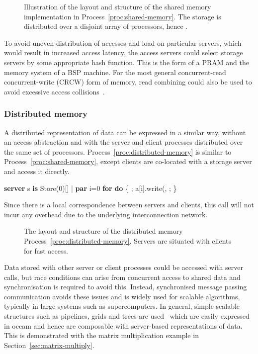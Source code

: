 \documentclass[11pt, conference, compsocconf, onecolumn]{IEEEtran}
\newcommand{\sect}[1]{Section~\ref{sec:#1}}
\newcommand{\proc}[1]{Process~\ref{proc:#1}}
\newcounter{process}
\newenvironment{Process}[1][]{\begin{procfloat}[ht]\vspace{-1.5mm}\refstepcounter{process}{\bf Process~\theprocess} #1}
{\vspace{-3.5mm}\end{procfloat}}
\newcommand{\w}[1]{{\bf #1}}
\newcommand{\inputtikz}[1]{
\begin{center}\end{center}}
\def\codespacing{1.5mm}
\newenvironment{myquote}
{\list{}{\leftmargin=4mm\rightmargin=4mm}\item[]}
{\endlist}
\newenvironment{code*}{\vspace{\codespacing}\begin{myquote}\begin{minipage}{\linewidth}\begin{alltt}}
{\end{alltt}\end{minipage}
\end{myquote}\vspace{\codespacing}
}
\begin{document}
\begin{figure}[t]
\inputtikz{figures/server-distributed-shared-memory}
\caption{Illustration of the layout and structure of the shared memory
implementation in \proc{shared-memory}. The storage is distributed over a
disjoint array of processors, hence .}
\label{fig:shared-memory}
\end{figure}

To avoid uneven distribution of accesses and load on particular servers, which
would result in increased access latency, the access servers could select
storage servers by some appropriate hash function.  This is the form of a PRAM
and the memory system of a BSP machine.  For the most general concurrent-read
concurrent-write (CRCW) form of memory, read combining could also be used to
avoid excessive access collisions~\cite{Ranade87}.

\subsubsection{Distributed memory}

A distributed representation of data can be expressed in a similar way, without
an access abstraction and with the server and client processes distributed over
the same set of processors. \proc{distributed-memory} is similar to
\proc{shared-memory}, except clients are co-located with a storage
server and access it directly.
\begin{Process}
\begin{code*}
\w{server} s \w{is} Store(0)[] |
\w{par} i=0 \w{for}  \w{do}
\{ ; a[i].write(, ;  \}
\end{code*}
\label{proc:distributed-memory}
\end{Process}
Since there is a local correspondence between servers and clients, this call
will not incur any overhead due to the underlying interconnection network. 

\begin{figure}[t]
\inputtikz{figures/server-distributed-memory}

\caption{The layout and structure of the distributed memory
\proc{distributed-memory}.  Servers are situated with clients for fast access.}

\label{fig:distributed-memory}
\end{figure}

Data stored with other server or client processes could be accessed with server
calls, but race conditions can arise from concurrent access to shared data and
synchronisation is required to avoid this.
Instead, synchronised message passing communication avoids these issues and is
widely used for scalable algorithms, typically in large systems such as
supercomputers. In general, simple scalable structures such as pipelines, grids
and trees are used~\cite{Hansen93} which are easily expressed in occam and
hence are composable with server-based representations of data. 
This is demonstrated with the matrix multiplication example in
\sect{matrix-multiply}.
\end{document}
